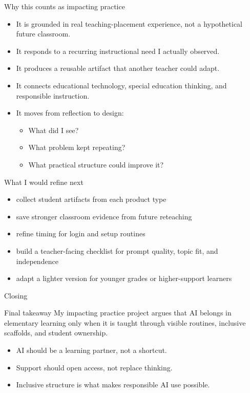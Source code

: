 \documentclass[aspectratio=169,11pt]{beamer}
\begin{document}
\begin{frame}{Why this counts as impacting practice}
\begin{itemize}
  \item It is grounded in real teaching-placement experience, not a hypothetical future classroom.
  \item It responds to a recurring instructional need I actually observed.
  \item It produces a reusable artifact that another teacher could adapt.
  \item It connects educational technology, special education thinking, and responsible instruction.
  \item It moves from reflection to design:
  \begin{itemize}
    \item What did I see?
    \item What problem kept repeating?
    \item What practical structure could improve it?
  \end{itemize}
\end{itemize}
\end{frame}

\begin{frame}{What I would refine next}
\begin{itemize}
  \item collect student artifacts from each product type
  \item save stronger classroom evidence from future reteaching
  \item refine timing for login and setup routines
  \item build a teacher-facing checklist for prompt quality, topic fit, and independence
  \item adapt a lighter version for younger grades or higher-support learners
\end{itemize}
\end{frame}

\begin{frame}{Closing}
\begin{block}{Final takeaway}
\Large My impacting practice project argues that AI belongs in elementary learning only when it is taught through visible routines, inclusive scaffolds, and student ownership.
\end{block}

\vspace{0.25cm}
\begin{itemize}
  \item AI should be a learning partner, not a shortcut.
  \item Support should open access, not replace thinking.
  \item Inclusive structure is what makes responsible AI use possible.
\end{itemize}
\end{frame}
\end{document}
